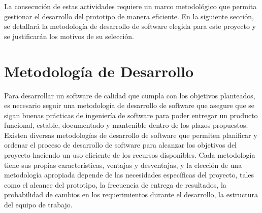 La consecución de estas actividades requiere un marco metodológico que permita gestionar el desarrollo del prototipo de manera eficiente. En la siguiente sección, se detallará la metodología de desarrollo de software elegida para este proyecto y se justificarán los motivos de su selección.



\section{Metodología de Desarrollo}
\label{sec:software-method}

Para desarrollar un software de calidad que cumpla con los objetivos planteados, es necesario seguir una metodología de desarrollo de software que asegure que se sigan buenas prácticas de ingeniería de software para poder entregar un producto funcional, estable, documentado y mantenible dentro de los plazos propuestos. Existen diversas metodologías de desarrollo de software que permiten planificar y ordenar el proceso de desarrollo de software para alcanzar los objetivos del proyecto haciendo un uso eficiente de los recursos disponibles. Cada metodología tiene sus propias características, ventajas y desventajas, y la elección de una metodología apropiada depende de las necesidades específicas del proyecto, tales como el alcance del prototipo, la frecuencia de entrega de resultados, la probabilidad de cambios en los requerimientos durante el desarrollo, la estructura del equipo de trabajo.

